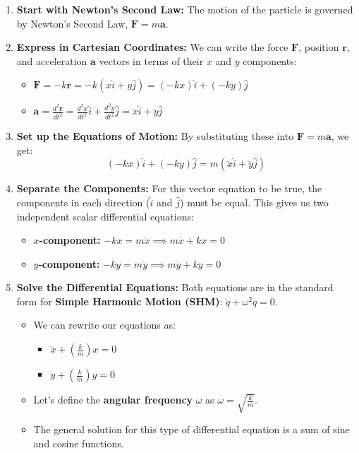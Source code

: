 \documentclass[11pt, a4paper]{article} %
\begin{document}
\begin{enumerate}
    \item \textbf{Start with Newton's Second Law:} The motion of the particle is governed by Newton's Second Law, $\textbf{F} = m\textbf{a}$.

    \item \textbf{Express in Cartesian Coordinates:} We can write the force $\textbf{F}$, position $\textbf{r}$, and acceleration $\textbf{a}$ vectors in terms of their $x$ and $y$ components:
    \begin{itemize}
        \item $\textbf{F} = -k\textbf{r} = -k(x\hat{i} + y\hat{j}) = (-kx)\hat{i} + (-ky)\hat{j}$
        \item $\textbf{a} = \frac{d^2\textbf{r}}{dt^2} = \frac{d^2x}{dt^2}\hat{i} + \frac{d^2y}{dt^2}\hat{j} = \ddot{x}\hat{i} + \ddot{y}\hat{j}$
    \end{itemize}

    \item \textbf{Set up the Equations of Motion:} By substituting these into $\textbf{F} = m\textbf{a}$, we get:
    $$(-kx)\hat{i} + (-ky)\hat{j} = m(\ddot{x}\hat{i} + \ddot{y}\hat{j})$$

    \item \textbf{Separate the Components:} For this vector equation to be true, the components in each direction ($\hat{i}$ and $\hat{j}$) must be equal. This gives us two independent scalar differential equations:
    \begin{itemize}
        \item \textbf{$x$-component:} $-kx = m\ddot{x} \implies m\ddot{x} + kx = 0$
        \item \textbf{$y$-component:} $-ky = m\ddot{y} \implies m\ddot{y} + ky = 0$
    \end{itemize}

    \item \textbf{Solve the Differential Equations:} Both equations are in the standard form for \textbf{Simple Harmonic Motion (SHM)}: $\ddot{q} + \omega^2 q = 0$.
    \begin{itemize}
        \item We can rewrite our equations as:
        \begin{itemize}
            \item $\ddot{x} + \left(\frac{k}{m}\right)x = 0$
            \item $\ddot{y} + \left(\frac{k}{m}\right)y = 0$
        \end{itemize}
        \item Let's define the \textbf{angular frequency} $\omega$ as $\omega = \sqrt{\frac{k}{m}}$.
        \item The general solution for this type of differential equation is a sum of sine and cosine functions.
    \end{itemize}


\end{enumerate}
\end{document}
